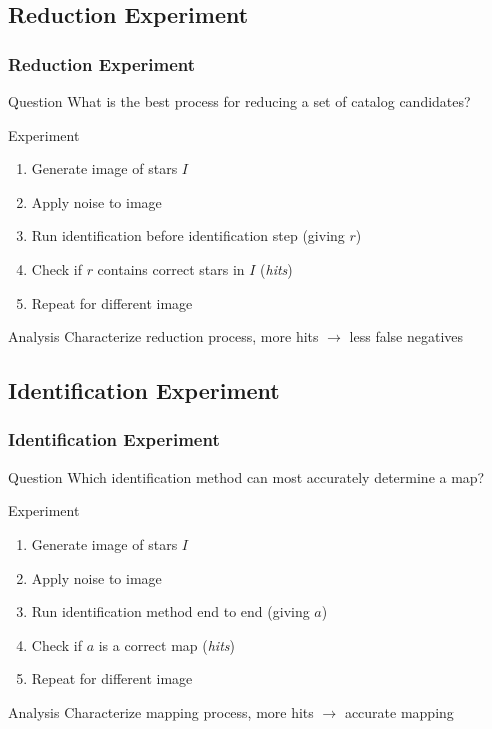 \documentclass[11pt]{beamer}
\begin{document}
    \subsection{Reduction Experiment}\label{subsec:reductionExperiment}
    \begin{frame}
        \frametitle{Reduction Experiment}
        \begin{block}{Question}
            What is the best process for reducing a set of catalog candidates?
        \end{block}
        \begin{block}{Experiment}
            \begin{enumerate}
                \item Generate image of stars $I$
                \item Apply noise to image
                \item Run identification before identification step (giving $r$)
                \item Check if $r$ contains correct stars in $I$ (\textit{hits})
                \item Repeat for different image
            \end{enumerate}
        \end{block}
        \begin{block}{Analysis}
            Characterize reduction process, more hits $\rightarrow$ less false negatives
        \end{block}
    \end{frame}

    \subsection{Identification Experiment}\label{subsec:identificationExperiment}
    \begin{frame}
        \frametitle{Identification Experiment}
        \begin{block}{Question}
            Which identification method can most accurately determine a map?
        \end{block}
        \begin{block}{Experiment}
            \begin{enumerate}
                \item Generate image of stars $I$
                \item Apply noise to image
                \item Run identification method end to end (giving $a$)
                \item Check if $a$ is a correct map (\textit{hits})
                \item Repeat for different image
            \end{enumerate}
        \end{block}
        \begin{block}{Analysis}
            Characterize mapping process, more hits $\rightarrow$ accurate mapping
        \end{block}
    \end{frame}
\end{document}
